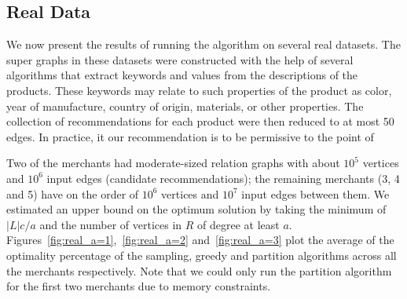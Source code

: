 \subsection{Real Data}
We now present the results of running the algorithm on several real
datasets. The super graphs in these datasets were constructed with the
help of several algorithms that extract keywords and values from the
descriptions of the products. These keywords may relate to such properties
of the product as color, year of manufacture, country of origin, materials, 
or other properties. The collection of recommendations for each product 
were then reduced to at most 50 edges. In practice, it our recommendation
is to be permissive to the point of 

Two of the merchants had moderate-sized relation graphs with
about $10^5$ vertices and $10^6$ input edges (candidate
recommendations); the remaining merchants (3, 4 and 5) have on the
order of $10^6$ vertices and $10^7$ input edges between them. 
We estimated an upper bound on the optimum solution by taking the minimum of
$|L|c/a$ and the number of vertices in $R$ of degree at least
$a$. Figures~\ref{fig:real_a=1},~\ref{fig:real_a=2}
and~\ref{fig:real_a=3} plot the average of the optimality
percentage of the sampling, greedy and partition algorithms across all
the merchants respectively. Note that we could only run the partition
algorithm for the first two merchants due to memory constraints. \vs

